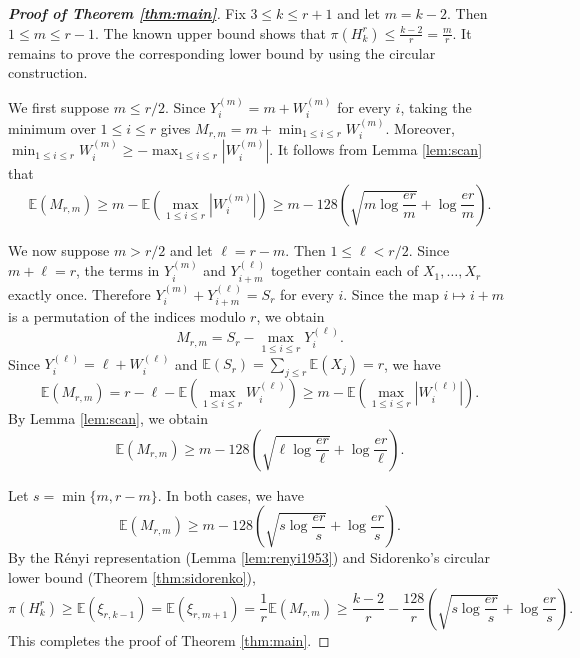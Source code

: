 \documentclass[10pt,a4paper]{amsart}
\numberwithin{equation}{section}
\begin{document}
\begin{proof}[\bfseries{Proof of Theorem \ref{thm:main}}]
Fix $3\le k\le r+1$ and let $m=k-2$.  Then $1\le m\le r-1$.
The known upper bound shows that
 $\pi(H_k^r)\le\frac{k-2}{r}=\frac mr.$
It remains to prove the corresponding lower bound by using the circular construction.

We first suppose $m\le r/2$.  Since
$Y_i^{(m)}=m+W_i^{(m)}$ for every $i$, taking the minimum over
$1\le i\le r$ gives
$M_{r,m}=m+\min_{1\le i\le r}W_i^{(m)}$.
Moreover,
$\min_{1\le i\le r}W_i^{(m)}
\ge-\max_{1\le i\le r}|W_i^{(m)}|$.
It follows from Lemma \ref{lem:scan} that
$$ \mathbb{E}(M_{r,m})
 \ge m-\mathbb{E}\left(\max_{1\le i\le r}|W_i^{(m)}|\right)
 \ge m-128\left(\sqrt{m\log\frac{er}{m}}+\log\frac{er}{m}\right).$$

We now suppose $m>r/2$ and let $\ell=r-m$.  Then $1\le\ell<r/2$.  Since
$m+\ell=r$, the terms in $Y_i^{(m)}$ and $Y_{i+m}^{(\ell)}$ together contain each of
$X_1,\ldots,X_r$ exactly once.  Therefore
$Y_i^{(m)}+Y_{i+m}^{(\ell)}=S_r$ for every $i$.  Since the map
$i\mapsto i+m$ is a permutation of the indices modulo $r$, we obtain
\begin{equation}\label{eq:complement-identity}
 M_{r,m}=S_r-\max_{1\le i\le r}Y_i^{(\ell)}.
\end{equation}
Since $Y_i^{(\ell)}=\ell+W_i^{(\ell)}$ and
$\mathbb{E}(S_r)=\sum_{j\le r} \mathbb{E}(X_j)=r$, we have
$$ \mathbb{E}(M_{r,m})
 =r-\ell-\mathbb{E}\left(\max_{1\le i\le r}W_i^{(\ell)}\right)
 \ge m-\mathbb{E}\left(\max_{1\le i\le r}|W_i^{(\ell)}|\right).$$
By Lemma \ref{lem:scan}, we obtain
$$ \mathbb{E}(M_{r,m})
 \ge m-128\left(\sqrt{\ell\log\frac{er}{\ell}}
                 +\log\frac{er}{\ell}\right).$$

Let $s=\min\{m,r-m\}$.  
In both cases, we have
$$
 \mathbb{E}(M_{r,m})
 \ge m-128\left(\sqrt{s\log\frac{er}{s}}
                 +\log\frac{er}{s}\right).
$$
By the R\'enyi representation (Lemma \ref{lem:renyi1953}) and Sidorenko's circular lower bound (Theorem \ref{thm:sidorenko}),
$$ \pi(H_k^r)
 \ge\mathbb{E}(\xi_{r,k-1})
 =\mathbb{E}(\xi_{r,m+1})
 =\frac1r\mathbb{E}(M_{r,m})
 \ge\frac{k-2}{r}-\frac{128}{r}
 \left(\sqrt{s\log\frac{er}{s}}+\log\frac{er}{s}\right).$$
This completes the proof of Theorem \ref{thm:main}.
\end{proof}
\end{document}
